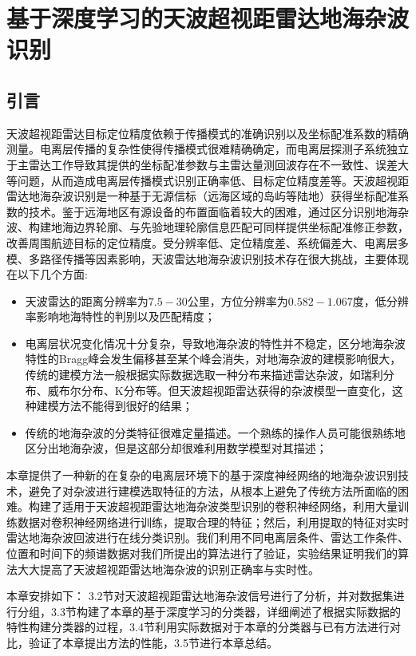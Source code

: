 \chapter{基于深度学习的天波超视距雷达地海杂波识别}
\section{引言}

天波超视距雷达目标定位精度依赖于传播模式的准确识别以及坐标配准系数的精确测量。电离层传播的复杂性使得传播模式很难精确确定，而电离层探测子系统独立于主雷达工作导致其提供的坐标配准参数与主雷达量测回波存在不一致性、误差大等问题，从而造成电离层传播模式识别正确率低、目标定位精度差等。天波超视距雷达地海杂波识别是一种基于无源信标（远海区域的岛屿等陆地）获得坐标配准系数的技术。鉴于远海地区有源设备的布置面临着较大的困难，通过区分识别地海杂波、构建地海边界轮廓、与先验地理轮廓信息匹配可同样提供坐标配准修正参数，改善周围航迹目标的定位精度。受分辨率低、定位精度差、系统偏差大、电离层多模、多路径传播等因素影响，天波雷达地海杂波识别技术存在很大挑战，主要体现在以下几个方面:
\begin{itemize}
	\item 天波雷达的距离分辨率为$7.5-30$公里，方位分辨率为$0.582-1.067$度，低分辨率影响地海特性的判别以及匹配精度；
	\item 电离层状况变化情况十分复杂，导致地海杂波的特性并不稳定，区分地海杂波特性的Bragg峰会发生偏移甚至某个峰会消失，对地海杂波的建模影响很大，传统的建模方法一般根据实际数据选取一种分布来描述雷达杂波，如瑞利分布、威布尔分布、K分布等。但天波超视距雷达获得的杂波模型一直变化，这种建模方法不能得到很好的结果；
	\item 传统的地海杂波的分类特征很难定量描述。一个熟练的操作人员可能很熟练地区分出地海杂波，但是这部分却很难利用数学模型对其描述；
\end{itemize}

本章提供了一种新的在复杂的电离层环境下的基于深度神经网络的地海杂波识别技术，避免了对杂波进行建模选取特征的方法，从根本上避免了传统方法所面临的困难。构建了适用于天波超视距雷达地海杂波类型识别的卷积神经网络，利用大量训练数据对卷积神经网络进行训练，提取合理的特征；然后，利用提取的特征对实时雷达地海杂波回波进行在线分类识别。我们利用不同电离层条件、雷达工作条件、位置和时间下的频谱数据对我们所提出的算法进行了验证，实验结果证明我们的算法大大提高了天波超视距雷达地海杂波的识别正确率与实时性。

本章安排如下： 3.2节对天波超视距雷达地海杂波信号进行了分析，并对数据集进行分组，3.3节构建了本章的基于深度学习的分类器，详细阐述了根据实际数据的特性构建分类器的过程，3.4节利用实际数据对于本章的分类器与已有方法进行对比，验证了本章提出方法的性能，3.5节进行本章总结。

